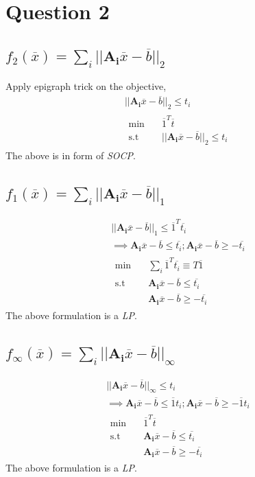 \documentclass{article}
\begin{document}
\section*{\hfil Question 2}
\subsection*{$f_2(\overline{x}) = \sum_{i}||\mathbf{A_i}\overline{x} - \overline{b}||_2$}
Apply epigraph trick on the objective,
\begin{gather*}
	||\mathbf{A_i}\overline{x} - \overline{b}||_2 \le t_i\\
	\begin{aligned}
		\min \quad & \overline{1}^T\overline{t}\\
		\textrm{s.t} \quad & ||\mathbf{A_i}\overline{x} - \overline{b}||_2 \le t_i
	\end{aligned}
\end{gather*}
The above is in form of \textit{SOCP}.
\subsection*{$f_1(\overline{x}) = \sum_{i}||\mathbf{A_i}\overline{x} - \overline{b}||_1$}
\begin{gather*}
	||\mathbf{A_i}\overline{x} - \overline{b}||_1 \le \overline{1}^T\overline{t_i}\\
	\implies \mathbf{A_i}\overline{x} - \overline{b} \le \overline{t_i}; \mathbf{A_i}\overline{x} - \overline{b} \ge -\overline{t_i}\\
	\begin{aligned}
		\min \quad & \sum_{i}\overline{1}^T\overline{t_i} \equiv T\overline{1}\\
		\textrm{s.t} \quad & \mathbf{A_i}\overline{x} - \overline{b} \le \overline{t_i}\\
		& \mathbf{A_i}\overline{x} - \overline{b} \ge -\overline{t_i}
	\end{aligned}
\end{gather*}
The above formulation is a \textit{LP}.
\subsection*{$f_\infty(\overline{x}) = \sum_{i}||\mathbf{A_i}\overline{x} - \overline{b}||_\infty$}
\begin{gather*}
	||\mathbf{A_i}\overline{x} - \overline{b}||_\infty \le t_i\\
	\implies \mathbf{A_i}\overline{x} - \overline{b} \le \overline{1}t_i; \mathbf{A_i}\overline{x} - \overline{b} \ge -\overline{1}t_i\\
	\begin{aligned}
		\min \quad & \overline{1}^T\overline{t} \\
		\textrm{s.t} \quad & \mathbf{A_i}\overline{x} - \overline{b} \le \overline{t_i}\\
		& \mathbf{A_i}\overline{x} - \overline{b} \ge -\overline{t_i}
	\end{aligned}
\end{gather*}
The above formulation is a \textit{LP}.
\end{document}
